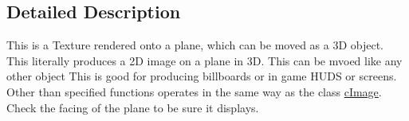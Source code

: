 \subsection{Detailed Description}
This is a Texture rendered onto a plane, which can be moved as a 3D object. This literally produces a 2D image on a plane in 3D. This can be mvoed like any other object This is good for producing billboards or in game HUDS or screens. Other than specified functions operates in the same way as the class \hyperlink{classc_image}{cImage}. Check the facing of the plane to be sure it displays. 